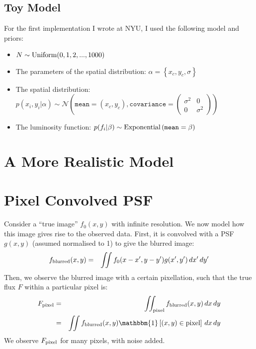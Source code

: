 \documentclass[letterpaper, 11pt]{article}
\begin{document}
\subsection{Toy Model}
For the first implementation I wrote at NYU, I used the following model and
priors:
\begin{itemize}
\item $N \sim \textnormal{Uniform}(0, 1, 2, ..., 1000)$ \\
\item The parameters of the spatial
distribution: $\alpha = \left\{x_c, y_c, \sigma\right\}$ \\
\item The spatial distribution: $p(x_i, y_i | \alpha)\sim\mathcal{N}\left(
\texttt{mean}=(x_c, y_c), \texttt{covariance}=
\left(\begin{array}{cc}\sigma^2 & 0 \\ 0 & \sigma^2\end{array}\right)\right)$ \\
\item The luminosity function: $p(f_i | \beta) \sim
\textnormal{Exponential}\left(\texttt{mean}=\beta\right)$
\end{itemize}



\section{A More Realistic Model}
\citep{2008ApJ...682..874K}

\appendix
\section{Pixel Convolved PSF}
Consider a ``true image'' $f_0(x, y)$ with infinite resolution. We now model how
this image gives rise to the observed data. First, it is convolved with a
PSF $g(x, y)$ (assumed normalised to 1) to give the blurred image:
\begin{eqnarray}
f_{\rm{blurred}}(x, y) &=& \iint f_0(x-x', y-y')
g(x', y') \, dx' \, dy' \label{blur}
\end{eqnarray}
Then, we observe the blurred image with a certain pixellation, such that
the true flux $F$ within a particular pixel is:
\begin{eqnarray}
F_{\rm{pixel}} &=& \iint_{\rm{pixel}} f_{\rm blurred}(x, y) \,dx\,dy\\
&=& \iint f_{\rm blurred}(x, y)\mathbbm{1}\left[(x,y) \in \textnormal{pixel}
\right] \,dx\,dy \label{pixel}
\end{eqnarray}
We observe $F_{\rm{pixel}}$ for many pixels, with noise added.
\end{document}
